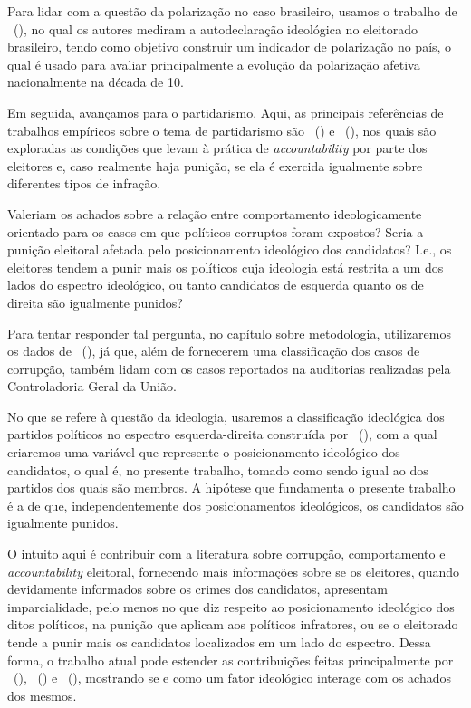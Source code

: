 \documentclass[
	12pt,				%
	openright,			%
	twoside,			%
	a4paper,			%
	openany,
	english,			%
	brazil				%
	]{abntex2}
\begin{document}
Para lidar com a questão da polarização no caso brasileiro, usamos o trabalho de ~(\citeyear{fuks2020afeto}), no qual os autores mediram a autodeclaração ideológica no eleitorado brasileiro, tendo como objetivo construir um indicador de polarização no país, o qual é usado para avaliar principalmente a evolução da polarização afetiva nacionalmente na década de 10.

Em seguida, avançamos para o partidarismo. Aqui, as principais referências de trabalhos empíricos sobre o tema de partidarismo são ~(\citeyear{Boas2019Apr}) e ~(\citeyear{Botero2021Apr}), nos quais são exploradas as condições que levam à prática de \textit{accountability} por parte dos eleitores e, caso realmente haja punição, se ela é exercida igualmente sobre diferentes tipos de infração.


Valeriam os achados sobre a relação entre comportamento ideologicamente orientado para os casos em que políticos corruptos foram expostos? Seria a punição eleitoral afetada pelo posicionamento ideológico dos candidatos? I.e., os eleitores tendem a punir mais os políticos cuja ideologia está restrita a um dos lados do espectro ideológico, ou tanto candidatos de esquerda quanto os de direita são igualmente punidos?

Para tentar responder tal pergunta, no capítulo sobre metodologia, utilizaremos os dados de ~(\citeyear{Brollo2013Aug}), já que, além de fornecerem uma classificação dos casos de corrupção, também lidam com os casos reportados na auditorias realizadas pela Controladoria Geral da União.

No que se refere à questão da ideologia, usaremos a classificação ideológica dos partidos políticos no espectro esquerda-direita construída por ~(\citeyear{Bolognesi2022Sep}), com a qual criaremos uma variável que represente o posicionamento ideológico dos candidatos, o qual é, no presente trabalho, tomado como sendo igual ao dos partidos dos quais são membros. A hipótese que fundamenta o presente trabalho é a de que, independentemente dos posicionamentos ideológicos, os candidatos são igualmente punidos.

O intuito aqui é contribuir com a literatura sobre corrupção, comportamento e \textit{accountability} eleitoral, fornecendo mais informações sobre se os eleitores, quando devidamente informados sobre os crimes dos candidatos, apresentam imparcialidade, pelo menos no que diz respeito ao posicionamento ideológico dos ditos políticos, na punição que aplicam aos políticos infratores, ou se o eleitorado tende a punir mais os candidatos localizados em um lado do espectro. Dessa forma, o trabalho atual pode estender as contribuições feitas principalmente por ~(\citeyear{ferraz2008exposing}), ~(\citeyear{Boas2019Apr}) e ~(\citeyear{Botero2021Apr}), mostrando se e como um fator ideológico interage com os achados dos mesmos.
\end{document}

